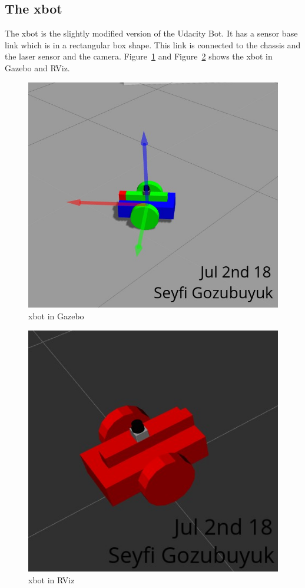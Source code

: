\documentclass[10pt,journal,compsoc]{IEEEtran}
\begin{document}
\subsection{The xbot}
The xbot is the slightly modified version of the Udacity Bot. It has a sensor base link which is in a rectangular box shape. This link is connected to the chassis and the laser sensor and the camera. Figure~\ref{fig:xbotgaz} and Figure~\ref{fig:xbotrvz} shows the xbot in Gazebo and RViz.

\begin{figure}[thpb]
      \centering
      \includegraphics[width=\linewidth]{figures/xbotGazebo.png}
      \caption{xbot in Gazebo}
      \label{fig:xbotgaz}
\end{figure}

\begin{figure}[thpb]
      \centering
      \includegraphics[width=\linewidth]{figures/xbotRViz.png}
      \caption{xbot in RViz}
      \label{fig:xbotrvz}
\end{figure}
\end{document}
